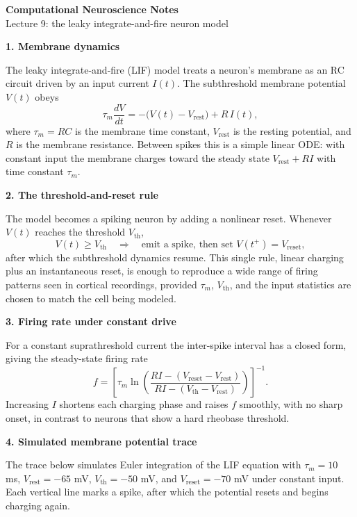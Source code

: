 \documentclass[10pt]{article}
\newcommand{\heading}[1]{{\bfseries\color{accent} #1}}
\begin{document}
{\LARGE\bfseries\color{accent} Computational Neuroscience Notes}\\[0.1em]
{\large Lecture 9: the leaky integrate-and-fire neuron model}

\vspace{0.5em}
\heading{1. Membrane dynamics}

The leaky integrate-and-fire (LIF) model treats a neuron's membrane as an
RC circuit driven by an input current $I(t)$. The subthreshold membrane
potential $V(t)$ obeys
\[
  \tau_m \frac{dV}{dt} = -\big(V(t) - V_{\text{rest}}\big) + R\, I(t),
\]
where $\tau_m = R C$ is the membrane time constant, $V_{\text{rest}}$ is the
resting potential, and $R$ is the membrane resistance. Between spikes this
is a simple linear ODE: with constant input the membrane charges toward the
steady state $V_{\text{rest}} + R I$ with time constant $\tau_m$.

\heading{2. The threshold-and-reset rule}

The model becomes a spiking neuron by adding a nonlinear reset. Whenever
$V(t)$ reaches the threshold $V_{\text{th}}$,
\[
  V(t) \ge V_{\text{th}} \quad\Longrightarrow\quad
  \text{emit a spike, then set } V(t^+) = V_{\text{reset}},
\]
after which the subthreshold dynamics resume. This single rule, linear
charging plus an instantaneous reset, is enough to reproduce a wide range of
firing patterns seen in cortical recordings, provided $\tau_m$, $V_{\text{th}}$,
and the input statistics are chosen to match the cell being modeled.

\heading{3. Firing rate under constant drive}

For a constant suprathreshold current the inter-spike interval has a closed
form, giving the steady-state firing rate
\[
  f = \left[ \tau_m \ln\!\left( \frac{R I - (V_{\text{reset}} - V_{\text{rest}})}
  {R I - (V_{\text{th}} - V_{\text{rest}})} \right) \right]^{-1}.
\]
Increasing $I$ shortens each charging phase and raises $f$ smoothly, with no
sharp onset, in contrast to neurons that show a hard rheobase threshold.

\heading{4. Simulated membrane potential trace}

The trace below simulates Euler integration of the LIF equation with
$\tau_m = 10$ ms, $V_{\text{rest}} = -65$ mV, $V_{\text{th}} = -50$ mV, and
$V_{\text{reset}} = -70$ mV under constant input. Each vertical line marks a
spike, after which the potential resets and begins charging again.
\end{document}

